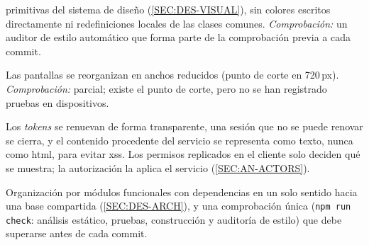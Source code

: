 \begin{description}
        primitivas del sistema de diseño (\cref{SEC:DES-VISUAL}), sin colores escritos
        directamente ni redefiniciones locales de las clases comunes. \emph{Comprobación:} un
        auditor de estilo automático que forma parte de la comprobación previa a cada commit.
  \item[RNF-7. Diseño adaptable.] Las pantallas se reorganizan en anchos reducidos (punto de
        corte en 720\,px). \emph{Comprobación:} parcial; existe el punto de corte, pero no se
        han registrado pruebas en dispositivos.
  \item[RNF-8. Seguridad en el cliente.] Los \textit{tokens} se renuevan de forma
        transparente, una sesión que no se puede renovar se cierra, y el contenido procedente
        del servicio se representa como texto, nunca como \acs{html}, para evitar
        \acs{xss}. Los permisos replicados en el cliente solo deciden qué se muestra; la
        autorización la aplica el servicio (\cref{SEC:AN-ACTORS}).
  \item[RNF-9. Mantenibilidad.] Organización por módulos funcionales con dependencias en un
        solo sentido hacia una base compartida (\cref{SEC:DES-ARCH}), y una comprobación
        única (\texttt{npm run check}: análisis estático, pruebas, construcción y auditoría
        de estilo) que debe superarse antes de cada commit.
\end{description}
